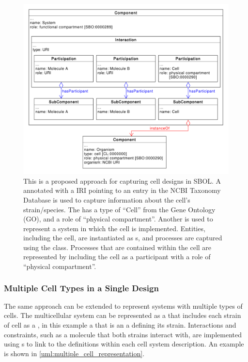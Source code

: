\begin{figure}[htp]
	\begin{center}
		\includegraphics[width=\textwidth]{uml/cell_representation}
		\caption[Repressenting a cell]{This is a proposed approach for capturing cell designs in SBOL. A  annotated with a IRI pointing to an entry in the NCBI Taxonomy Database is used to capture information about the cell's strain/species. 
		The  has a type of ``Cell'' from the Gene Ontology (GO), and a role of ``physical compartment''. 
		Another  is used to represent a system in which the cell is implemented. 
		Entities, including the cell, are instantiated as s, and processes are captured using the  class.
		Processes that are contained within the cell are represented by including the cell as a participant with a role of ``physical compartment''. }
		\label{uml:cell_representation}
	\end{center}
\end{figure}

\subsubsection{Multiple Cell Types in a Single Design}

The same approach can be extended to represent systems with multiple types of cells.
The multicellular system can be represented as a  that includes each strain of cell as a , in this example a  that is an  a  defining its strain.
Interactions and constraints, such as a molecule that both strains interact with, are implemented using s to link to the definitions within each cell system description.
An example is shown in \ref{uml:multiple_cell_representation}.


